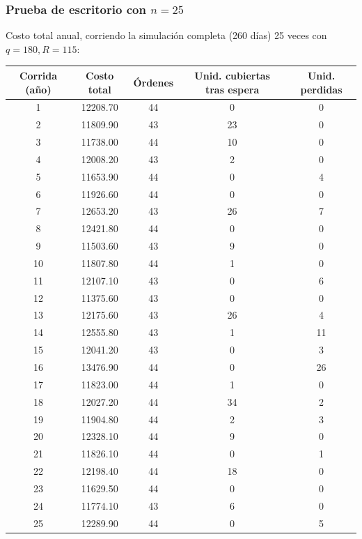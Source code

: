 \subsubsection{\texorpdfstring{Prueba de escritorio con $n=25$}{Prueba de escritorio con n=25}}

Costo total anual, corriendo la simulación completa (260 días) 25 veces con $q=180,R=115$:

\begin{center}
\small
\begin{tabular}{ccccc}
\toprule
Corrida (año) & Costo total & Órdenes & Unid. cubiertas tras espera & Unid. perdidas \\
\midrule
1  & 12208.70 & 44 & 0  & 0  \\
2  & 11809.90 & 43 & 23 & 0  \\
3  & 11738.00 & 44 & 10 & 0  \\
4  & 12008.20 & 43 & 2  & 0  \\
5  & 11653.90 & 44 & 0  & 4  \\
6  & 11926.60 & 44 & 0  & 0  \\
7  & 12653.20 & 43 & 26 & 7  \\
8  & 12421.80 & 44 & 0  & 0  \\
9  & 11503.60 & 43 & 9  & 0  \\
10 & 11807.80 & 44 & 1  & 0  \\
11 & 12107.10 & 43 & 0  & 6  \\
12 & 11375.60 & 43 & 0  & 0  \\
13 & 12175.60 & 43 & 26 & 4  \\
14 & 12555.80 & 43 & 1  & 11 \\
15 & 12041.20 & 43 & 0  & 3  \\
16 & 13476.90 & 44 & 0  & 26 \\
17 & 11823.00 & 44 & 1  & 0  \\
18 & 12027.20 & 44 & 34 & 2  \\
19 & 11904.80 & 44 & 2  & 3  \\
20 & 12328.10 & 44 & 9  & 0  \\
21 & 11826.10 & 44 & 0  & 1  \\
22 & 12198.40 & 44 & 18 & 0  \\
23 & 11629.50 & 44 & 0  & 0  \\
24 & 11774.10 & 43 & 6  & 0  \\
25 & 12289.90 & 44 & 0  & 5  \\
\bottomrule
\end{tabular}
\end{center}

